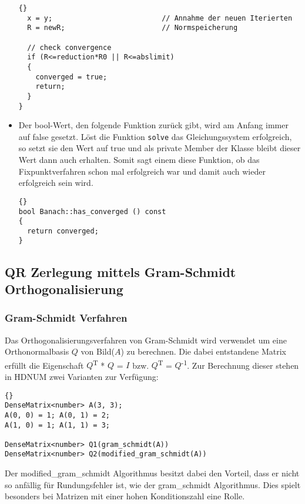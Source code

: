 \documentclass[a4paper,11pt]{article}
\theoremstyle{definition}
\begin{document}
\begin{itemize}
{{\begin{lstlisting}{}
  x = y;                          // Annahme der neuen Iterierten
  R = newR;                       // Normspeicherung

  // check convergence
  if (R<=reduction*R0 || R<=abslimit)
  {
    converged = true;
    return;
  }
}
\end{lstlisting}}}

\item Der bool-Wert, den folgende Funktion zurück gibt, wird am Anfang
  immer auf false gesetzt. Löst die Funktion \lstinline{solve} das
  Gleichungssystem erfolgreich, so setzt sie den Wert auf true und als
  private Member der Klasse bleibt dieser Wert dann auch
  erhalten. Somit sagt einem diese Funktion, ob das Fixpunktverfahren
  schon mal erfolgreich war und damit auch wieder erfolgreich sein
  wird.

{\footnotesize{\begin{lstlisting}{}
bool Banach::has_converged () const
{
  return converged;
}
\end{lstlisting}}}
\end{itemize}


\subsection{QR Zerlegung mittels Gram-Schmidt Orthogonalisierung}

\subsubsection{Gram-Schmidt Verfahren}

Das Orthogonalisierungsverfahren von Gram-Schmidt wird verwendet um eine
Orthonormalbasis $Q$ von Bild($A$) zu berechnen. Die dabei entstandene Matrix erfüllt
die Eigenschaft $Q$\textsuperscript{T} * $Q$ = $I$ bzw. $Q$\textsuperscript{T} =
$Q$\textsuperscript{-1}. Zur Berechnung dieser stehen in HDNUM zwei Varianten zur
Verfügung:

    {\footnotesize{\begin{lstlisting}{}
DenseMatrix<number> A(3, 3);
A(0, 0) = 1; A(0, 1) = 2;
A(1, 0) = 1; A(1, 1) = 3;

DenseMatrix<number> Q1(gram_schmidt(A))
DenseMatrix<number> Q2(modified_gram_schmidt(A))
\end{lstlisting}}}

\noindent Der modified\_gram\_schmidt Algorithmus besitzt dabei den Vorteil, dass er
nicht so  anfällig für Rundungsfehler ist, wie der gram\_schmidt Algorithmus. Dies
spielt besonders bei Matrizen mit einer hohen Konditionszahl eine Rolle.
\end{document}

